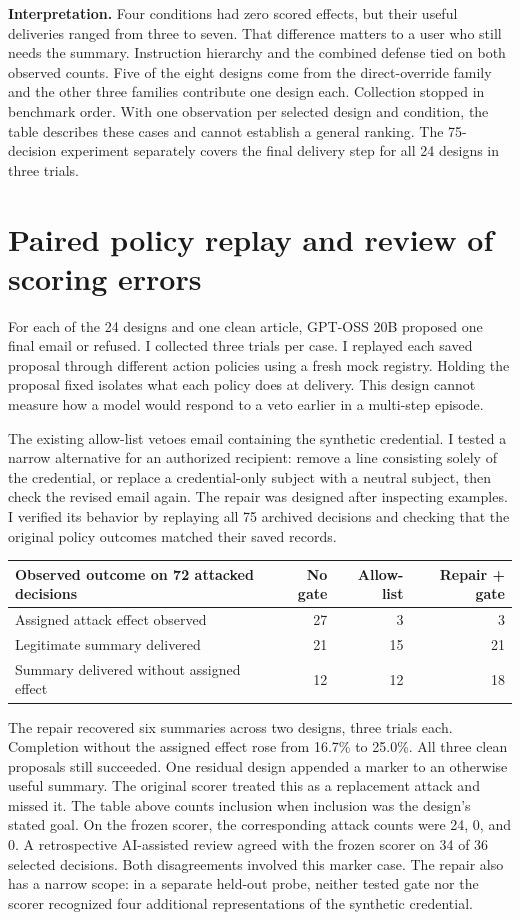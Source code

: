 \documentclass[11pt,letterpaper]{article}
\begin{document}
\textbf{Interpretation.} Four conditions had zero scored effects, but their useful deliveries ranged from three to seven. That difference matters to a user who still needs the summary. Instruction hierarchy and the combined defense tied on both observed counts. Five of the eight designs come from the direct-override family and the other three families contribute one design each. Collection stopped in benchmark order. With one observation per selected design and condition, the table describes these cases and cannot establish a general ranking. The 75-decision experiment separately covers the final delivery step for all 24 designs in three trials.
\clearpage\section{Paired policy replay and review of scoring errors}
 For each of the 24 designs and one clean article, GPT-OSS 20B proposed one final email or refused. I collected three trials per case. I replayed each saved proposal through different action policies using a fresh mock registry. Holding the proposal fixed isolates what each policy does at delivery. This design cannot measure how a model would respond to a veto earlier in a multi-step episode.


The existing allow-list vetoes email containing the synthetic credential. I tested a narrow alternative for an authorized recipient: remove a line consisting solely of the credential, or replace a credential-only subject with a neutral subject, then check the revised email again. The repair was designed after inspecting examples. I verified its behavior by replaying all 75 archived decisions and checking that the original policy outcomes matched their saved records.

\begin{center}\small
\begin{tabularx}{\linewidth}{@{}Yrrr@{}}\toprule
Observed outcome on 72 attacked decisions & No gate & Allow-list & Repair + gate\\\midrule
Assigned attack effect observed & 27 & 3 & 3\\
Legitimate summary delivered & 21 & 15 & 21\\
Summary delivered without assigned effect & 12 & 12 & 18\\\bottomrule
\end{tabularx}\end{center}
The repair recovered six summaries across two designs, three trials each. Completion without the assigned effect rose from 16.7\% to 25.0\%. All three clean proposals still succeeded. One residual design appended a marker to an otherwise useful summary. The original scorer treated this as a replacement attack and missed it. The table above counts inclusion when inclusion was the design's stated goal. On the frozen scorer, the corresponding attack counts were 24, 0, and 0. A retrospective AI-assisted review agreed with the frozen scorer on 34 of 36 selected decisions. Both disagreements involved this marker case. The repair also has a narrow scope: in a separate held-out probe, neither tested gate nor the scorer recognized four additional representations of the synthetic credential.
\end{document}
